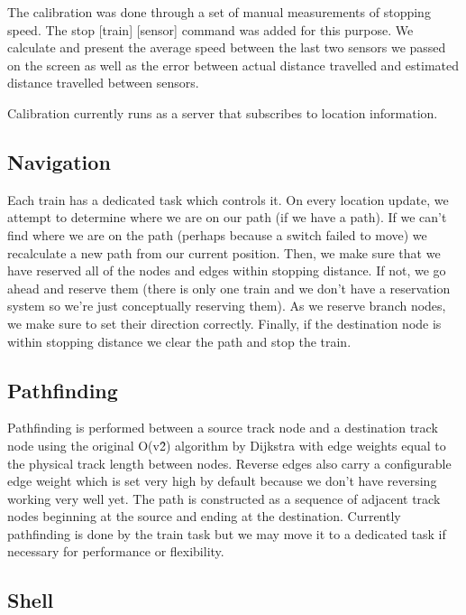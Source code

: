 \documentclass{article}
\begin{document}
The calibration was done through a set of manual measurements of stopping speed. The stop [train] [sensor] command was added for this purpose.  We calculate and present the average speed between the last two sensors we passed on the screen as well as the error between actual distance travelled and estimated distance travelled between sensors.

Calibration currently runs as a server that subscribes to location information.

\subsection{Navigation}

Each train has a dedicated task which controls it. On every location update, we attempt to determine where we are on our path (if we have a path). If we can't find where we are on the path (perhaps because a switch failed to move) we recalculate a new path from our current position. Then, we make sure that we have reserved all of the nodes and edges within stopping distance. If not, we go ahead and reserve them (there is only one train and we don't have a reservation system so we're just conceptually reserving them). As we reserve branch nodes, we make sure to set their direction correctly. Finally, if the destination node is within stopping distance we clear the path and stop the train.

\subsection{Pathfinding}

Pathfinding is performed between a source track node and a destination track node using the original O(v\^2) algorithm by Dijkstra with edge weights equal to the physical track length between nodes. Reverse edges also carry a configurable edge weight which is set very high by default because we don't have reversing working very well yet. The path is constructed as a sequence of adjacent track nodes beginning at the source and ending at the destination. Currently pathfinding is done by the train task but we may move it to a dedicated task if necessary for performance or flexibility.

\subsection{Shell}
\end{document}
